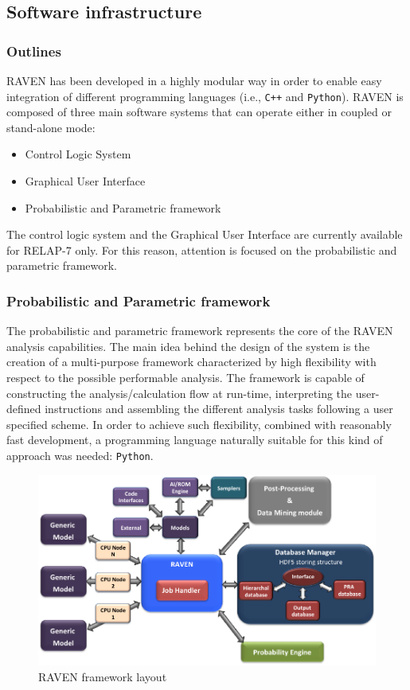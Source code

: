 \subsection{Software infrastructure}
\subsubsection{Outlines}
RAVEN has been developed in a highly modular way in order to enable easy integration of different programming languages (i.e., \texttt{C++} and \texttt{Python}).
RAVEN is composed of three main software systems that can operate either in coupled or stand-alone mode:
\begin{itemize}
  \item Control Logic System
  \item Graphical User Interface
  \item Probabilistic and Parametric framework
\end{itemize}
The control logic system and the Graphical User Interface are currently available for RELAP-7 only. For this reason, attention is focused on the probabilistic and parametric framework.

\subsubsection{Probabilistic and Parametric framework}
The probabilistic and parametric framework represents the core of the RAVEN analysis capabilities. The main idea behind the design of the system is the creation of a multi-purpose framework characterized by high flexibility with respect to the possible performable analysis. The framework is capable of constructing the analysis/calculation flow at run-time, interpreting the user-defined instructions and assembling the different analysis tasks following a user specified scheme. 
In order to achieve such flexibility, combined with reasonably fast development, a programming language naturally suitable for this kind of approach was needed: \texttt{Python}.  

\begin{figure}[ht]
  \centering
  \includegraphics[width=1.0\textwidth]  {pics/RavenFramework.png}
  \caption{RAVEN framework layout}
  \label{fig:RAVENframeworkLayout}
\end{figure}

